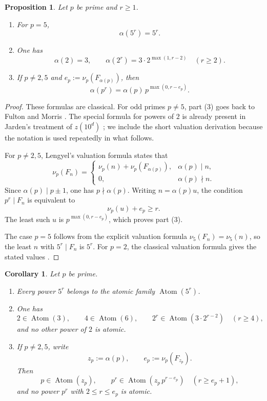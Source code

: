 \documentclass[11pt,letterpaper]{article}
\numberwithin{equation}{section}
\theoremstyle{plain}
\newtheorem{proposition}[theorem]{Proposition}
\newtheorem{corollary}[theorem]{Corollary}
\theoremstyle{definition}
\theoremstyle{remark}
\DeclareMathOperator{\Atom}{Atom}
\begin{document}
\begin{proposition}
\label{thm:prime-power-apparition-ladders}
Let $p$ be prime and $r\ge 1$.
\begin{enumerate}[label=(\arabic*)]
\item For $p=5$,
\[
\alpha(5^r)=5^r.
\]
\item One has
\[
\alpha(2)=3,
\qquad
\alpha(2^r)=3\cdot 2^{\max(1,r-2)}\quad (r\ge 2).
\]
\item If $p\neq 2,5$ and $e_p:=\nu_p(F_{\alpha(p)})$, then
\[
\alpha(p^r)=\alpha(p)\,p^{\max(0,r-e_p)}.
\]
\end{enumerate}
\end{proposition}

\begin{proof}
These formulas are classical. For odd primes $p\neq 5$, part (3) goes back to
Fulton and Morris \cite{FultonMorris1969ArithmeticalFunctions}. The special
formula for powers of $2$ is already present in Jarden's treatment of
$z(10^d)$ \cite{Jarden1966RecurringSequences}; we include the short valuation
derivation because the notation is used repeatedly in what follows.

For $p\neq 2,5$, Lengyel's valuation formula \cite{Lengyel1995OrderFibonacciLucas}
states that
\[
\nu_p(F_n)=
\begin{cases}
\nu_p(n)+\nu_p(F_{\alpha(p)}), & \alpha(p)\mid n,\\
0, & \alpha(p)\nmid n.
\end{cases}
\]
Since $\alpha(p)\mid p\pm 1$, one has $p\nmid \alpha(p)$. Writing
$n=\alpha(p)u$, the condition $p^r\mid F_n$ is equivalent to
\[
\nu_p(u)+e_p\ge r.
\]
The least such $u$ is $p^{\max(0,r-e_p)}$, which proves part (3).

The case $p=5$ follows from the explicit valuation formula
$\nu_5(F_n)=\nu_5(n)$, so the least $n$ with $5^r\mid F_n$ is $5^r$. For
$p=2$, the classical valuation formula gives the stated values
\cite{Lengyel1995OrderFibonacciLucas,Jarden1966RecurringSequences}.
\end{proof}

\begin{corollary}
\label{cor:atomic-prime-power-inputs}
Let $p$ be prime.
\begin{enumerate}[label=(\arabic*)]
\item Every power $5^r$ belongs to the atomic family $\Atom(5^r)$.
\item One has
\[
2\in \Atom(3),\qquad 4\in \Atom(6),
\qquad
2^r\in \Atom(3\cdot 2^{r-2})\quad (r\ge 4),
\]
and no other power of $2$ is atomic.
\item If $p\neq 2,5$, write
\[
z_p:=\alpha(p),
\qquad
e_p:=\nu_p(F_{z_p}).
\]
Then
\[
p\in \Atom(z_p),
\qquad
p^r\in \Atom(z_p\,p^{r-e_p})\quad (r\ge e_p+1),
\]
and no power $p^r$ with $2\le r\le e_p$ is atomic.
\end{enumerate}
\end{corollary}
\end{document}
